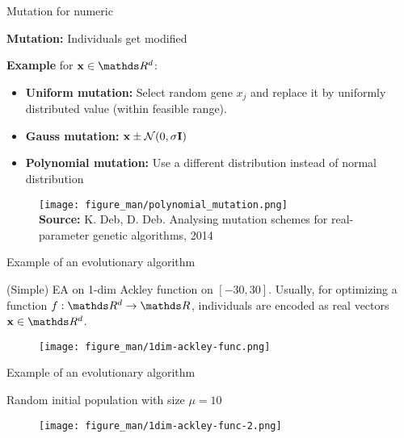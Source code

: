 \documentclass[11pt,compress,t,notes=noshow, xcolor=table]{beamer}
\begin{document}
\begin{vbframe}{Mutation for numeric}
\footnotesize

\textbf{Mutation:} Individuals get modified

\medskip

\textbf{Example} for $\xv \in \R^d$:

\begin{itemize}
    \item \textbf{Uniform mutation:} Select random gene $x_j$ and replace it by uniformly distributed value (within feasible range).
    \item \textbf{Gauss mutation:} $\mathbf{x} \pm \mathcal{N}(0, \sigma \mathbf{I})$
    \item \textbf{Polynomial mutation:} Use a different distribution instead of normal distribution
\end{itemize}
\begin{center}

\begin{figure}
  \texttt{[image: figure\_man/polynomial\_mutation.png]}\\
  \scriptsize{\textbf{Source:} K. Deb, D. Deb. Analysing mutation schemes for real-parameter genetic algorithms, 2014}
\end{figure}
\end{center}

\end{vbframe}

\begin{vbframe}{Example of an evolutionary algorithm}
\small

(Simple) EA on 1-dim Ackley function on $[-30, 30]$.
Usually, for optimizing a function $f : \R^d \to \R$, individuals are encoded as real vectors $\xv \in \R^d$.

\medskip

\begin{center}
\begin{figure}
  \texttt{[image: figure\_man/1dim-ackley-func.png]}
\end{figure}
\end{center}

\end{vbframe}

\begin{vbframe}{Example of an evolutionary algorithm}

Random initial population with size $\mu = 10$

\medskip

\begin{center}
\begin{figure}
  \texttt{[image: figure\_man/1dim-ackley-func-2.png]}
\end{figure}
\end{center}

\end{vbframe}
\end{document}
